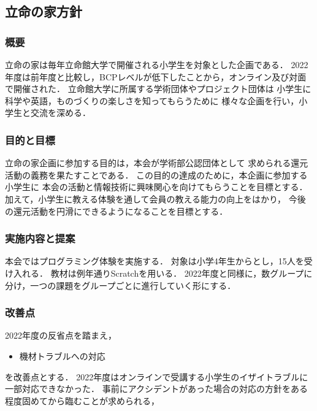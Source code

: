 \subsection*{立命の家方針}



\subsubsection*{概要}
立命の家は毎年立命館大学で開催される小学生を対象とした企画である．
2022年度は前年度と比較し，BCPレベルが低下したことから，オンライン及び対面で開催された．
立命館大学に所属する学術団体やプロジェクト団体は
小学生に科学や英語，ものづくりの楽しさを知ってもらうために
様々な企画を行い，小学生と交流を深める．

\subsubsection*{目的と目標}
立命の家企画に参加する目的は，本会が学術部公認団体として
求められる還元活動の義務を果たすことである．
この目的の達成のために，本企画に参加する小学生に
本会の活動と情報技術に興味関心を向けてもらうことを目標とする．
加えて，小学生に教える体験を通して会員の教える能力の向上をはかり，
今後の還元活動を円滑にできるようになることを目標とする．

\subsubsection*{実施内容と提案}
本会ではプログラミング体験を実施する．
対象は小学4年生からとし，15人を受け入れる．
教材は例年通りScratchを用いる．
2022年度と同様に，数グループに分け，一つの課題をグループごとに進行していく形にする．

\subsubsection*{改善点}
2022年度の反省点を踏まえ，
\begin{itemize}
  \item 機材トラブルへの対応
\end{itemize}
を改善点とする．
2022年度はオンラインで受講する小学生のイザイトラブルに一部対応できなかった．
事前にアクシデントがあった場合の対応の方針をある程度固めてから臨むことが求められる，

